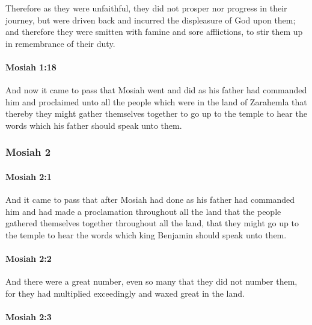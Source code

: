 			Therefore as they were unfaithful,
			they did not prosper nor progress in their journey,
			but were driven back and incurred the displeasure of God upon them;
			and therefore they were smitten with famine and sore afflictions,
			to stir them up in remembrance of their duty.

		\paragraph{Mosiah 1:18} %
			\label{MOSIAH-1-18}

			And now it came to pass that
			Mosiah went and did as his father had commanded him
			and proclaimed unto all the people which were in the land of Zarahemla
			that thereby they might gather themselves together
			to go up to the temple to hear the words which his father should speak unto them.
			
	\subsubsection{Mosiah 2} %
		\label{MOSIAH-2}
	
		\paragraph{Mosiah 2:1} %
			\label{MOSIAH-2-1}
			
			And it came to pass that after Mosiah had done as his father had commanded him
			and had made a proclamation throughout all the land
			that the people gathered themselves together throughout all the land,
			that they might go up to the temple to hear the words
			which king Benjamin should speak unto them.
			
		\paragraph{Mosiah 2:2} %
			\label{MOSIAH-2-2}
			
			And there were a great number,
			even so many that they did not number them,
			for they had multiplied exceedingly and waxed great in the land.
			
		\paragraph{Mosiah 2:3} %
			\label{MOSIAH-2-3}
			
